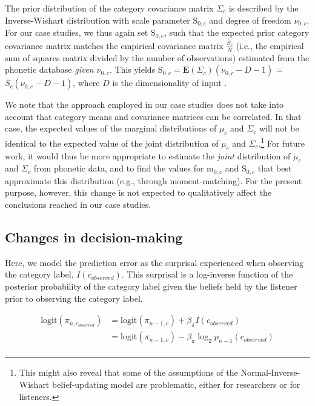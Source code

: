 \documentclass[
  11pt,
  man,floatsintext]{apa6}
\begin{document}
The prior distribution of the category covariance matrix \(\Sigma_c\) is described by the Inverse-Wishart distribution with scale parameter \(\mathrm{S_{0,c}}\) and degree of freedom \(\nu_{0,c}\). For our case studies, we thus again set \(\mathrm{S_{0,c}}\), such that the expected prior category covariance matrix matches the empirical covariance matrix \(\frac{\bar{S}_c}{N}\) (i.e., the empirical sum of squares matrix divided by the number of observations) estimated from the phonetic database \emph{given \(\nu_{0,c}\)}. This yields \(\mathrm{S_{0,c}} = \mathbf{E}(\Sigma_c)(\nu_{0,c}-D-1)\) = \(\bar{S}_c(\nu_{0,c}-D-1)\), where \(D\) is the dimensionality of input \autocite[i.e., the number of phonetic cues considered, cf.][p.~134-5]{murphy2012}.

We note that the approach employed in our case studies does not take into account that category means and covariance matrices can be correlated. In that case, the expected values of the marginal distributions of \(\mu_c\) and \(\Sigma_c\) will not be identical to the expected value of the joint distribution of \(\mu_c\) and \(\Sigma_c\).\footnote{This might also reveal that some of the assumptions of the Normal-Inverse-Wishart belief-updating model are problematic, either for researchers or for listeners.} For future work, it would thus be more appropriate to estimate the \emph{joint} distribution of \(\mu_c\) and \(\Sigma_c\) from phonetic data, and to find the values for \(\mathrm{m}_{0,c}\) and \(\mathrm{S}_{0,c}\) that best approximate this distribution (e.g., through moment-matching). For the present purpose, however, this change is not expected to qualitatively affect the conclusions reached in our case studies.

\hypertarget{sec:SI-models-changes-in-decision-making}{%
\subsection{Changes in decision-making}\label{sec:SI-models-changes-in-decision-making}}

Here, we model the prediction error as the surprisal experienced when observing the category label, \(I(c_{observed})\). This surprisal is a log-inverse function of the posterior probability of the category label given the beliefs held by the listener prior to observing the category label.

\begin{equation}\label{eq:bias-updating}
\begin{split}
\mathrm{logit}(\pi_{n,c_{observed}}) & = \mathrm{logit}(\pi_{n-1,c}) + \beta_{\pi} I(c_{observed}) \\
                          & = \mathrm{logit}(\pi_{n-1,c}) - \beta_{\pi} \log_2 p_{n-1}(c_{observed}) \\
\end{split}
\end{equation}
\end{document}
